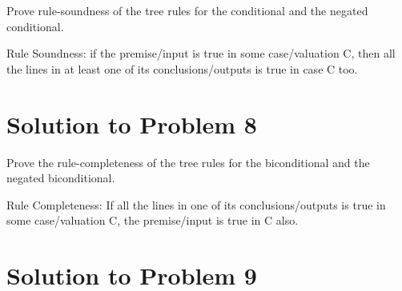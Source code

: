 \documentclass[12pt]{article}
\begin{document}
Prove rule-soundness of the tree rules for the conditional and the negated conditional.

Rule Soundness: if the premise/input is true in some case/valuation C, then all the lines in at least
one of its conclusions/outputs is true in case C too.




\section*{Solution to Problem 8}
 Prove the rule-completeness of the tree rules for the biconditional and the negated biconditional.  
 
Rule Completeness:  If all the lines in one of its conclusions/outputs  is true in some case/valuation 
C, the premise/input is true in C also.



\section*{Solution to Problem 9}
\end{document}
